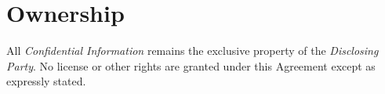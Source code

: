 
\section{Ownership}
\label{sec:ownership}

All \textit{Confidential Information} remains the exclusive property of the \textit{Disclosing Party}. No license or other rights are granted under this Agreement except as expressly stated.

